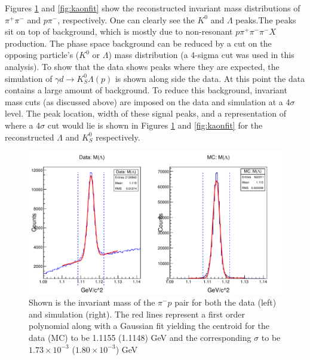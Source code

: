 \documentclass[prb,10pt,twocolumn,tightenlines,superscriptaddress]{revtex4-1}
\begin{document}
Figures \ref{fig:lambdafit} and \ref{fig:kaonfit} show the reconstructed invariant mass distributions of $\pi^{+}\pi^{-}$ and $p\pi^{-}$, respectively. One can clearly see the $K^{0}$ and $\Lambda$ peaks.The peaks sit on top of background, which is mostly due to non-resonant $p\pi^{+}\pi^{-}\pi^{-}X$ production. The phase space background can be reduced by a cut on the opposing particle's ($K^{0}$ or $\Lambda$) mass distribution (a 4-sigma cut was used in this analysis). To show that the data shows peaks where they are expected, the simulation of $\gamma d\rightarrow K^{0}_{S}\Lambda(p)$ is shown along side the data. At this point the data contains a large amount of background. To reduce this background, invariant mass cuts (as discussed above) are imposed on the data and simulation at a 4$\sigma$ level.
The peak location, width of these signal peaks, and a representation of where a 4$\sigma$ cut would lie is shown in Figures \ref{fig:lambdafit} and \ref{fig:kaonfit} for the reconstructed $\Lambda$ and $K^{0}_{S}$ respectively.

\begin{figure}[h]
    \centering
      \includegraphics[width=\linewidth]{lambda}
    \caption{Shown is the invariant mass of the $\pi^{-}p$ pair for both the data (left) and simulation (right). The red lines represent a first order polynomial along with a Gaussian fit yielding the centroid for the data (MC) to be 1.1155 (1.1148) GeV and the corresponding $\sigma$ to be $1.73\times 10^{-3}$ ($1.80\times 10^{-3}$) GeV}
        \label{fig:lambdafit}%
\end{figure}
\end{document}
